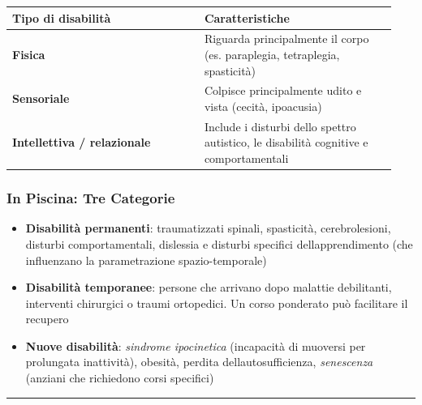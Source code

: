 \documentclass[a4paper,11pt]{article}
\providecommand{\tightlist}{%
  \setlength{\itemsep}{0pt}\setlength{\parskip}{0pt}}
\begin{document}
\begin{longtable}[]{@{}p{0.47\linewidth}p{0.47\linewidth}@{}}
      \toprule\noalign{}
      Tipo di disabilità                  & Caratteristiche                                   \\
      \midrule\noalign{}
      \endhead
      \bottomrule\noalign{}
      \endlastfoot
      \textbf{Fisica}                     & Riguarda principalmente il corpo (es. paraplegia,
      tetraplegia, spasticità)                                                                \\
      \textbf{Sensoriale}                 & Colpisce principalmente udito e vista (cecità,
      ipoacusia)                                                                              \\
      \textbf{Intellettiva / relazionale} & Include i disturbi dello spettro
      autistico, le disabilità cognitive e comportamentali                                    \\
\end{longtable}

\subsubsection{In Piscina: Tre
      Categorie}\label{in-piscina-tre-categorie}

\begin{itemize}
      \tightlist
      \item
            \textbf{Disabilità permanenti}: traumatizzati spinali, spasticità,
            cerebrolesioni, disturbi comportamentali, dislessia e disturbi
            specifici dell\textquotesingle apprendimento (che influenzano la
            parametrazione spazio-temporale)
      \item
            \textbf{Disabilità temporanee}: persone che arrivano dopo malattie
            debilitanti, interventi chirurgici o traumi ortopedici. Un corso
            ponderato può facilitare il recupero
      \item
            \textbf{Nuove disabilità}: \emph{sindrome ipocinetica} (incapacità di
            muoversi per prolungata inattività), obesità, perdita
            dell\textquotesingle autosufficienza, \emph{senescenza} (anziani che
            richiedono corsi specifici)
\end{itemize}

\begin{center}\rule{0.5\linewidth}{0.5pt}\end{center}
\end{document}
